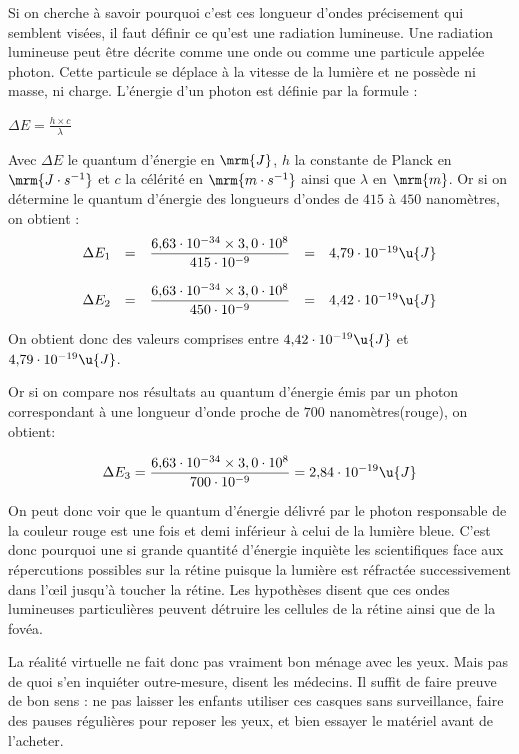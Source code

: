 \documentclass[12pt, a4paper]{report}
\begin{document}
Si on cherche à savoir pourquoi c'est ces longueur d'ondes précisement qui semblent visées, il faut définir ce qu'est une radiation lumineuse. Une radiation lumineuse peut être décrite comme une onde ou comme une particule appelée photon. Cette particule se déplace à la vitesse de la lumière et ne possède ni masse, ni charge. L'énergie d'un photon est définie par la formule :
\begin{center}
 \Large{$\Delta E = \frac{h \times c}{\lambda}$}
\end{center}
 Avec $\Delta E$ le quantum d'énergie en $\mrm{J}$, $h$ la constante de Planck en $\mrm{J \cdot s^{-1}}$ et $c$ la célérité en $\mrm{m \cdot s^{-1}}$ ainsi que $\lambda$ en $\mrm{m}$. Or si on détermine le quantum d'énergie des longueurs d'ondes de $415$ à $450$ nanomètres, on obtient :
\[
\begin{array}{rcccl}
\Delta E_1 &=& \dfrac{6{,}63 \cdot 10^{-34} \times 3,0 \cdot 10^8}{415 \cdot 10^{-9}} &=& 4{,}79 \cdot 10^{-19}\u{J} \\

&&&&\\

\Delta E_2 &=& \dfrac{6{,}63 \cdot 10^{-34} \times 3,0 \cdot 10^8}{450 \cdot 10^{-9}} &=& 4{,}42 \cdot 10^{-19}\u{J}
\end{array}
\]

On obtient donc des valeurs comprises entre $ 4{,}42 \cdot 10^{-19}\u{J}$ et $4{,}79 \cdot 10^{-19}\u{J}$.

Or si on compare nos résultats au quantum d'énergie émis par un photon correspondant à une longueur d'onde proche de $700$ nanomètres(rouge), on obtient:
\begin{center}

\[
\Delta E_3 = \dfrac{6{,}63 \cdot 10^{-34} \times 3,0 \cdot 10^8}{700 \cdot 10^{-9}} = 2{,}84 \cdot 10^{-19}\u{J}
\]

\end{center}

On peut donc voir que le quantum d'énergie délivré par le photon responsable de la couleur rouge est une fois et demi inférieur à celui de la lumière bleue.
C'est donc pourquoi une si grande quantité d'énergie inquiète les scientifiques face aux répercutions possibles sur la rétine puisque la lumière est réfractée successivement dans l'\oe{}il jusqu'à toucher la rétine. Les hypothèses disent que ces ondes lumineuses particulières peuvent détruire les cellules de la rétine ainsi que de la fovéa.

La réalité virtuelle ne fait donc pas vraiment bon ménage avec les yeux. Mais pas de quoi s'en inquiéter outre-mesure, disent les médecins. Il suffit de faire preuve de bon sens : ne pas laisser les enfants utiliser ces casques sans surveillance, faire des pauses régulières pour reposer les yeux, et bien essayer le matériel avant de l'acheter.
\end{document}
